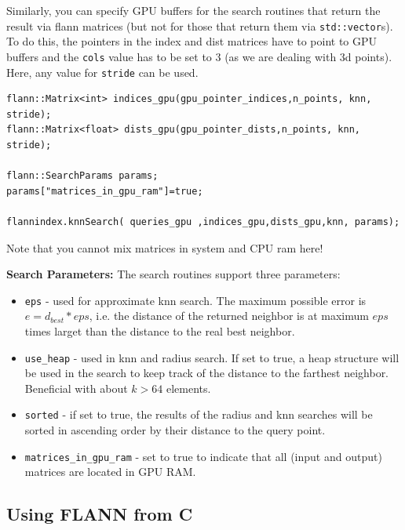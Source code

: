 \documentclass[letter,10pt]{article}
\begin{document}
Similarly, you can specify GPU buffers for the search routines that return the result via flann matrices (but not for those that return them via \texttt{std::vector}s).
To do this, the pointers in the index and dist matrices have to point to GPU buffers and the \texttt{cols} value has to be set to 3 (as we are dealing with 3d points). Here, any value for \texttt{stride} can be used.
\begin{Verbatim}[fontsize=\footnotesize,frame=single]
flann::Matrix<int> indices_gpu(gpu_pointer_indices,n_points, knn, stride);
flann::Matrix<float> dists_gpu(gpu_pointer_dists,n_points, knn, stride);

flann::SearchParams params;
params["matrices_in_gpu_ram"]=true;

flannindex.knnSearch( queries_gpu ,indices_gpu,dists_gpu,knn, params);
\end{Verbatim}
\begin{description}
 \item Note that you cannot mix matrices in system and CPU ram here!
\end{description}

\textbf{Search Parameters:}
The search routines support three parameters:
\begin{itemize}
 \item \texttt{eps} - used for approximate knn search. The maximum possible error is $e= d_{best} * eps$, i.e. the distance of the returned neighbor is at maximum $eps$ times larget than the distance to the real best neighbor.
 \item \texttt{use\_heap} - used in knn and radius search. If set to true, a heap structure will be used in the search to keep track of the distance to the farthest neighbor. Beneficial with about $k>64$ elements.
 \item \texttt{sorted} - if set to true, the results of the radius and knn searches will be sorted in ascending order by their distance to the query point.
 \item \texttt{matrices\_in\_gpu\_ram} - set to true to indicate that all (input and output) matrices are located in GPU RAM.
\end{itemize}


\subsection{Using FLANN from C}
\end{document}
